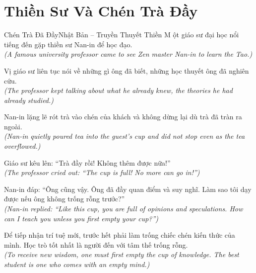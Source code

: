 \section{Thiền Sư Và Chén Trà Đầy}
\begin{truyen}{Chén Trà Đã Đầy}{Nhật Bản -- Truyền Thuyết Thiền}
M ột giáo sư đại học nổi tiếng đến gặp thiền sư Nan-in để học đạo.\\
\textit{(A famous university professor came to see Zen master Nan-in to learn the Tao.)}

Vị giáo sư liên tục nói về những gì ông đã biết, những học thuyết ông đã nghiên cứu.\\
\textit{(The professor kept talking about what he already knew, the theories he had already studied.)}

Nan-in lặng lẽ rót trà vào chén của khách và không dừng lại dù trà đã tràn ra ngoài.\\
\textit{(Nan-in quietly poured tea into the guest's cup and did not stop even as the tea overflowed.)}

Giáo sư kêu lên: ``Trà đầy rồi! Không thêm được nữa!''\\
\textit{(The professor cried out: ``The cup is full! No more can go in!'')}

Nan-in đáp: ``Ông cũng vậy. Ông đã đầy quan điểm và suy nghĩ. Làm sao tôi dạy được nếu ông không trống rỗng trước?''\\
\textit{(Nan-in replied: ``Like this cup, you are full of opinions and speculations. How can I teach you unless you first empty your cup?'')}

\end{truyen}
\begin{baihoc}
  Để tiếp nhận trí tuệ mới, trước hết phải làm trống chiếc chén kiến thức của mình. Học trò tốt nhất là người đến với tâm thế trống rỗng.\\
  \textit{(To receive new wisdom, one must first empty the cup of knowledge. The best student is one who comes with an empty mind.)}
\end{baihoc}

